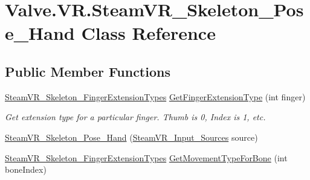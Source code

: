 \hypertarget{class_valve_1_1_v_r_1_1_steam_v_r___skeleton___pose___hand}{}\section{Valve.\+V\+R.\+Steam\+V\+R\+\_\+\+Skeleton\+\_\+\+Pose\+\_\+\+Hand Class Reference}
\label{class_valve_1_1_v_r_1_1_steam_v_r___skeleton___pose___hand}
\subsection*{Public Member Functions}
\begin{DoxyCompactItemize}
\item 
\mbox{\hyperlink{namespace_valve_1_1_v_r_af4f7ce87893374f71b2fa2ba112642da}{Steam\+V\+R\+\_\+\+Skeleton\+\_\+\+Finger\+Extension\+Types}} \mbox{\hyperlink{class_valve_1_1_v_r_1_1_steam_v_r___skeleton___pose___hand_a78d76c9bae2c0eec3f21b8feb1576d92}{Get\+Finger\+Extension\+Type}} (int finger)
\begin{DoxyCompactList}\small\item\em Get extension type for a particular finger. Thumb is 0, Index is 1, etc. \end{DoxyCompactList}\item 
\mbox{\hyperlink{class_valve_1_1_v_r_1_1_steam_v_r___skeleton___pose___hand_a45dbb8c35c911f7df189ebf1dbb6b443}{Steam\+V\+R\+\_\+\+Skeleton\+\_\+\+Pose\+\_\+\+Hand}} (\mbox{\hyperlink{namespace_valve_1_1_v_r_a82e5bf501cc3aa155444ee3f0662853f}{Steam\+V\+R\+\_\+\+Input\+\_\+\+Sources}} source)
\item 
\mbox{\hyperlink{namespace_valve_1_1_v_r_af4f7ce87893374f71b2fa2ba112642da}{Steam\+V\+R\+\_\+\+Skeleton\+\_\+\+Finger\+Extension\+Types}} \mbox{\hyperlink{class_valve_1_1_v_r_1_1_steam_v_r___skeleton___pose___hand_a6b724e265eceb2e37fa2c6550faf01db}{Get\+Movement\+Type\+For\+Bone}} (int bone\+Index)
\end{DoxyCompactItemize}
